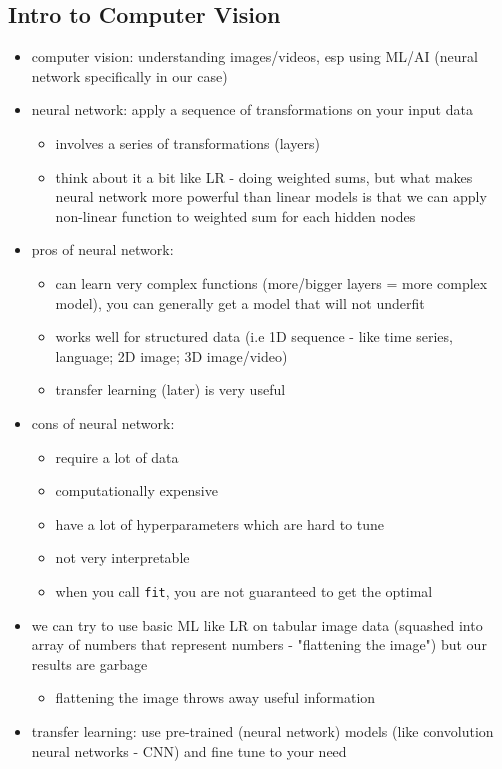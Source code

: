 \documentclass[10.5pt,a4paper, fleqn, dvipsnames]{article}
\begin{document}
\subsection*{Intro to Computer Vision}
\begin{itemize}
    \item computer vision: understanding images/videos, esp using ML/AI (neural network specifically in our case)
    \item neural network: apply a sequence of transformations on your input data 
    \begin{itemize}
        \item involves a series of transformations (layers)
        \item think about it a bit like LR - doing weighted sums, but what makes neural network more powerful than linear models is that we can apply non-linear function to weighted sum for each hidden nodes 
    \end{itemize}
    \item pros of neural network: 
    \begin{itemize}
        \item can learn very complex functions (more/bigger layers = more complex model), you can generally get a model that will not underfit
        \item works well for structured data (i.e 1D sequence - like time series, language; 2D image; 3D image/video)
        \item transfer learning (later) is very useful
    \end{itemize}
    \item cons of neural network:
    \begin{itemize}
        \item require a lot of data
        \item computationally expensive 
        \item have a lot of hyperparameters which are hard to tune 
        \item not very interpretable 
        \item when you call \lstinline{fit}, you are not guaranteed to get the optimal
    \end{itemize}
    \item we can try to use basic ML like LR on tabular image data (squashed into array of numbers that represent numbers - "flattening the image") but our results are garbage 
    \begin{itemize}
        \item flattening the image throws away useful information
    \end{itemize}
    \item transfer learning: use pre-trained (neural network) models (like convolution neural networks - CNN) and fine tune to your need 
\end{itemize}
\end{document}
